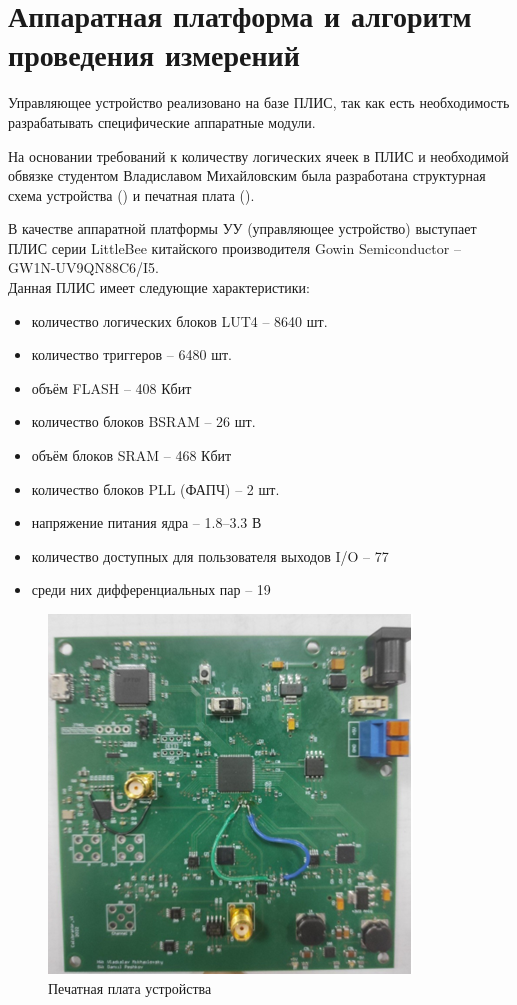 \chapter{Аппаратная платформа и алгоритм проведения измерений}
	
Управляющее устройство реализовано на базе ПЛИС, так как есть необходимость разрабатывать 
специфические аппаратные модули.

На основании требований к количеству логических ячеек в ПЛИС и необходимой обвязке студентом Владиславом
Михайловским была разработана структурная схема устройства () и печатная плата ().

В качестве аппаратной платформы УУ (управляющее устройство) выступает ПЛИС серии
LittleBee китайского производителя Gowin Semiconductor -- GW1N-UV9QN88C6/I5.\\

\noindent Данная ПЛИС имеет следующие характеристики:\\


\begin{itemize}
	\item количество логических блоков LUT4 -- 8640 шт.
	\item количество триггеров -- 6480 шт.
	\item объём FLASH -- 408 Кбит
	\item количество блоков BSRAM -- 26 шт.
	\item объём блоков SRAM -- 468 Кбит
	\item количество блоков PLL (ФАПЧ) -- 2 шт.
	\item напряжение питания ядра -- 1.8–3.3 В
	\item количество доступных для пользователя выходов I/O -- 77
	\item среди них дифференциальных пар -- 19\\
\end{itemize}

\begin{figure}[ht!] 
	\center
	\includegraphics {my_folder/images//pcb}
	\caption{Печатная плата устройства} 
	\label{fig:pcb}  
\end{figure}

